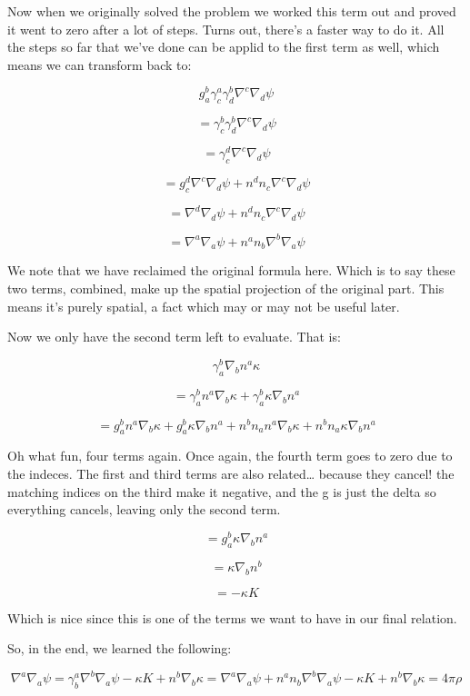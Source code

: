 \documentclass[landscape,letterpaper,10pt,english]{article}
\begin{document}
Now when we originally solved the problem we worked this term out and
proved it went to zero after a lot of steps. Turns out, there's a faster
way to do it. All the steps so far that we've done can be applid to the
first term as well, which means we can transform back to:

\[ g^b_a \gamma^a_c \gamma_d^b \nabla^c \nabla_d \psi \]

\[ = \gamma^b_c \gamma_d^b \nabla^c \nabla_d \psi \]

\[ = \gamma^d_c \nabla^c \nabla_d \psi \]

\[ = g^d_c \nabla^c \nabla_d \psi + n^dn_c \nabla^c \nabla_d \psi \]

\[ = \nabla^d \nabla_d \psi + n^dn_c \nabla^c \nabla_d \psi \]

\[ = \nabla^a \nabla_a \psi + n^an_b \nabla^b \nabla_a \psi \]

We note that we have reclaimed the original formula here. Which is to
say these two terms, combined, make up the spatial projection of the
original part. This means it's purely spatial, a fact which may or may
not be useful later.

    Now we only have the second term left to evaluate. That is:

\[ \gamma^b_a \nabla_b n^a \kappa \]

\[ = \gamma^b_a n^a \nabla_b \kappa + \gamma^b_a \kappa \nabla_b n^a\]

\[ = g^b_a n^a \nabla_b \kappa + g^b_a \kappa \nabla_b n^a + n^bn_a n^a \nabla_b \kappa + n^bn_a \kappa \nabla_b n^a\]

    Oh what fun, four terms again. Once again, the fourth term goes to zero
due to the indeces. The first and third terms are also related\ldots{}
because they cancel! the matching indices on the third make it negative,
and the g is just the delta so everything cancels, leaving only the
second term.

\[ = g^b_a \kappa \nabla_b n^a \]

\[ = \kappa \nabla_b n^b \]

\[ = - \kappa K \]

Which is nice since this is one of the terms we want to have in our
final relation.

So, in the end, we learned the following:

\[ \nabla^a \nabla_a \psi = \gamma^a_b \nabla^b \nabla_a \psi - \kappa K + n^b \nabla_b \kappa = \nabla^a \nabla_a \psi + n^an_b \nabla^b \nabla_a \psi -\kappa K + n^b \nabla_b \kappa = 4\pi \rho\]
\end{document}
